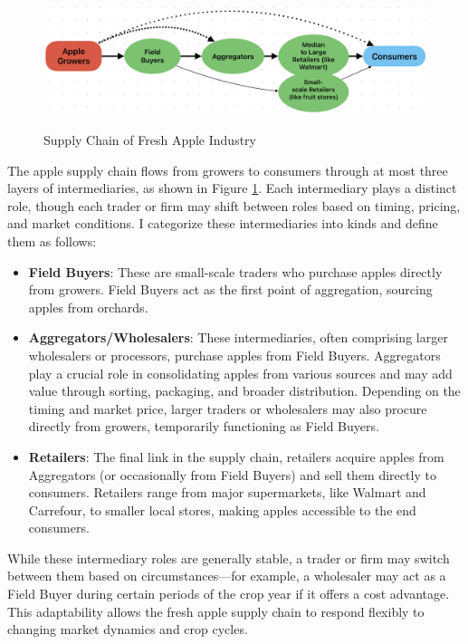 \begin{figure}[hpt]
    \centering
        \caption{Supply Chain of Fresh Apple Industry}
    \includegraphics[width=\linewidth]{figures/Supply_Chain_flow.png}
    \label{fig: supply chain flow}
\end{figure}
The apple supply chain flows from growers to consumers through at most three layers of intermediaries, as shown in Figure \ref{fig: supply chain flow}. Each intermediary plays a distinct role, though each trader or firm may shift between roles based on timing, pricing, and market conditions. I categorize these intermediaries into kinds and define them as follows:

\begin{itemize}
    \item \textbf{Field Buyers}: These are small-scale traders who purchase apples directly from growers. Field Buyers act as the first point of aggregation, sourcing apples from orchards.
    
    \item \textbf{Aggregators/Wholesalers}: These intermediaries, often comprising larger wholesalers or processors, purchase apples from Field Buyers. Aggregators play a crucial role in consolidating apples from various sources and may add value through sorting, packaging, and broader distribution. Depending on the timing and market price, larger traders or wholesalers may also procure directly from growers, temporarily functioning as Field Buyers.
    
    \item \textbf{Retailers}: The final link in the supply chain, retailers acquire apples from Aggregators (or occasionally from Field Buyers) and sell them directly to consumers. Retailers range from major supermarkets, like Walmart and Carrefour, to smaller local stores, making apples accessible to the end consumers.
\end{itemize}

While these intermediary roles are generally stable, a trader or firm may switch between them based on circumstances---for example, a wholesaler may act as a Field Buyer during certain periods of the crop year if it offers a cost advantage. This adaptability allows the fresh apple supply chain to respond flexibly to changing market dynamics and crop cycles.




